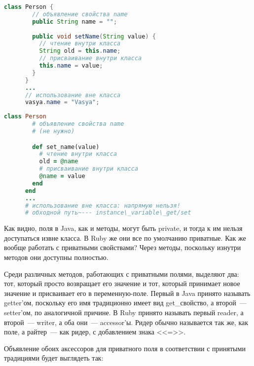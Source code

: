 \documentclass[a4paper, 14pt, titlepage]{extarticle}
\newenvironment{halfpage}%
    {\noindent\begin{minipage}[h]{0.49\linewidth}} %
    {\end{minipage}\hfill}
\begin{document}
  \begin{halfpage}
    \begin{lstlisting}[language=Java, title={Свойство в Java}, gobble=6, texcl]
      class Person {
        // объявление свойства name
        public String name = "";
        
        public void setName(String value) {
          // чтение внутри класса
          String old = this.name;
          // присваивание внутри класса
          this.name = value;
        }
      }
      ...
      // использование вне класса
      vasya.name = "Vasya";
    \end{lstlisting}
  \end{halfpage}
  \begin{halfpage}
    \begin{lstlisting}[language=Ruby, title={Свойство в Ruby}, gobble=6, texcl]
      class Person
        # объявление свойства name
        # (не нужно)

        def set_name(value)
          # чтение внутри класса
          old = @name
          # присваивание внутри класса
          @name = value
        end
      end
      ...
      # использование вне класса: напрямую нельзя!
      # обходной путь~--- instance\_variable\_get/set
    \end{lstlisting}
  \end{halfpage}

  Как видно, поля в Java, как и методы, могут быть private, и тогда к им нельзя доступаться извне
  класса. В Ruby же они все по умолчанию приватные. Как же вообще работать с приватными свойствами?
  Через методы, поскольку изнутри методов они доступны полностью.

  Среди различных методов, работающих с приватными полями, выделяют два: тот, который просто
  возвращает его значение и тот, который принимает новое значение и присваивает его в
  переменную-поле. Первый в Java принято называть getter'ом, поскольку его имя традиционно имеет вид
  get\_свойство, а второй~--- setter'ом, по аналогичной причине. В Ruby принято называть первый
  reader, а второй~--- writer, а оба они~--- accessor'ы. Ридер обычно называется так же, как поле, а
  райтер~--- как ридер, с добавлением знака <<=>>.

  Объявление обоих аксессоров для приватного поля в соответствии с принятыми традициями будет
  выглядеть так:
\end{document}
